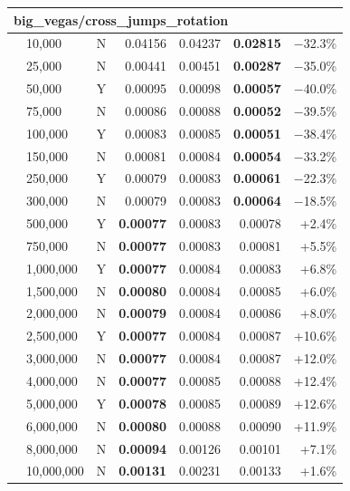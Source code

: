 \documentclass[9pt]{article}
\begin{document}
\begin{longtable}{llr|rrr|r}
\midrule
\multicolumn{7}{l}{\textbf{big\_vegas/cross\_jumps\_rotation}} \\
\midrule
 & 10,000 & N & 0.04156 & 0.04237 & \textbf{0.02815} & $-$32.3\% \\
 & 25,000 & N & 0.00441 & 0.00451 & \textbf{0.00287} & $-$35.0\% \\
 & 50,000 & Y & 0.00095 & 0.00098 & \textbf{0.00057} & $-$40.0\% \\
 & 75,000 & N & 0.00086 & 0.00088 & \textbf{0.00052} & $-$39.5\% \\
 & 100,000 & Y & 0.00083 & 0.00085 & \textbf{0.00051} & $-$38.4\% \\
 & 150,000 & N & 0.00081 & 0.00084 & \textbf{0.00054} & $-$33.2\% \\
 & 250,000 & Y & 0.00079 & 0.00083 & \textbf{0.00061} & $-$22.3\% \\
 & 300,000 & N & 0.00079 & 0.00083 & \textbf{0.00064} & $-$18.5\% \\
\rowcolor{win} & 500,000 & Y & \textbf{0.00077} & 0.00083 & 0.00078 & +2.4\% \\
\rowcolor{win} & 750,000 & N & \textbf{0.00077} & 0.00083 & 0.00081 & +5.5\% \\
\rowcolor{win} & 1,000,000 & Y & \textbf{0.00077} & 0.00084 & 0.00083 & +6.8\% \\
\rowcolor{win} & 1,500,000 & N & \textbf{0.00080} & 0.00084 & 0.00085 & +6.0\% \\
\rowcolor{win} & 2,000,000 & N & \textbf{0.00079} & 0.00084 & 0.00086 & +8.0\% \\
\rowcolor{win} & 2,500,000 & Y & \textbf{0.00077} & 0.00084 & 0.00087 & +10.6\% \\
\rowcolor{win} & 3,000,000 & N & \textbf{0.00077} & 0.00084 & 0.00087 & +12.0\% \\
\rowcolor{win} & 4,000,000 & N & \textbf{0.00077} & 0.00085 & 0.00088 & +12.4\% \\
\rowcolor{win} & 5,000,000 & Y & \textbf{0.00078} & 0.00085 & 0.00089 & +12.6\% \\
\rowcolor{win} & 6,000,000 & N & \textbf{0.00080} & 0.00088 & 0.00090 & +11.9\% \\
\rowcolor{win} & 8,000,000 & N & \textbf{0.00094} & 0.00126 & 0.00101 & +7.1\% \\
\rowcolor{win} & 10,000,000 & N & \textbf{0.00131} & 0.00231 & 0.00133 & +1.6\% \\


\end{longtable}
\end{document}
